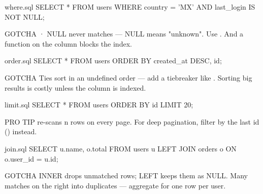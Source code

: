 \begin{sld}
  \begin{codecard}{where.sql}
SELECT * FROM users
WHERE country = 'MX'
  AND last_login IS NOT NULL;
  \end{codecard}
  \begin{callout}[dotamber]{GOTCHA · NULL}
   never matches — NULL means "unknown". Use . And a function on the column blocks the index.
  \end{callout}
\end{sld}

\begin{sld}
  \begin{codecard}{order.sql}
SELECT * FROM users
ORDER BY created_at DESC, id;
  \end{codecard}
  \begin{callout}[dotamber]{GOTCHA}
  Ties sort in an undefined order — add a tiebreaker like . Sorting big results is costly unless the column is indexed.
  \end{callout}
\end{sld}

\begin{sld}
  \begin{codecard}{limit.sql}
SELECT * FROM users
ORDER BY id
LIMIT 20;
  \end{codecard}
  \begin{callout}[dotgreen]{PRO TIP}
   re-scans n rows on every page. For deep pagination, filter by the last id () instead.
  \end{callout}
\end{sld}

\begin{sld}
  \begin{codecard}{join.sql}
SELECT u.name, o.total
FROM users u
LEFT JOIN orders o ON o.user_id = u.id;
  \end{codecard}
  \begin{callout}[dotamber]{GOTCHA}
  INNER drops unmatched rows; LEFT keeps them as NULL. Many matches on the right  into duplicates — aggregate for one row per user.
  \end{callout}
\end{sld}

